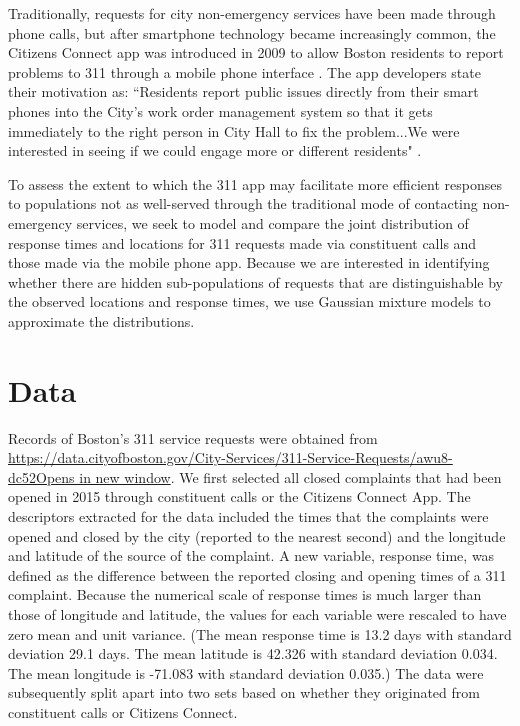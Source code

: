 \documentclass[twoside]{article}
\theoremstyle{theorem}
\theoremstyle{theorem}
\theoremstyle{theorem}
\theoremstyle{lemma}
\theoremstyle{definition}
\theoremstyle{example}
\begin{document}
Traditionally, requests for city non-emergency services have been made through phone calls, but after smartphone technology became increasingly common, the Citizens Connect app was introduced in 2009 to allow Boston residents to report problems to 311 through a mobile phone interface \cite{newurbanmechanics}. The app developers state their motivation as: ``Residents report public issues directly from their smart phones into the City's work order management system so that it gets immediately to the right person in City Hall to fix the problem...We were interested in seeing if we could engage more or different residents" \cite{newurbanmechanics}.  

To assess the extent to which the 311 app may facilitate more efficient responses to populations not as well-served through the traditional mode of contacting non-emergency services, we seek to model and compare the joint distribution of response times and locations for 311 requests made via constituent calls and those made via the mobile phone app. Because we are interested in identifying whether there are hidden sub-populations of requests that are distinguishable by the observed locations and response times, we use Gaussian mixture models to approximate the distributions. 
\section{Data}
Records of Boston's 311 service requests were obtained from \url{https://data.cityofboston.gov/City-Services/311-Service-Requests/awu8-dc52Opens in new window}. We first selected all closed complaints that had been opened in 2015 through constituent calls or the Citizens Connect App. The descriptors extracted for the data included the times that the complaints were opened and closed by the city (reported to the nearest second) and the longitude and latitude of the source of the complaint. A new variable, response time, was defined as the difference between the reported closing and opening times of a 311 complaint. Because the numerical scale of response times is much larger than those of longitude and latitude, the values for each variable were rescaled to have zero mean and unit variance. (The mean response time is 13.2 days with standard deviation 29.1 days. The mean latitude is 42.326 with standard deviation 0.034. The mean longitude is -71.083 with standard deviation 0.035.) The data were subsequently split apart into two sets based on whether they originated from constituent calls or Citizens Connect. 
\end{document}
